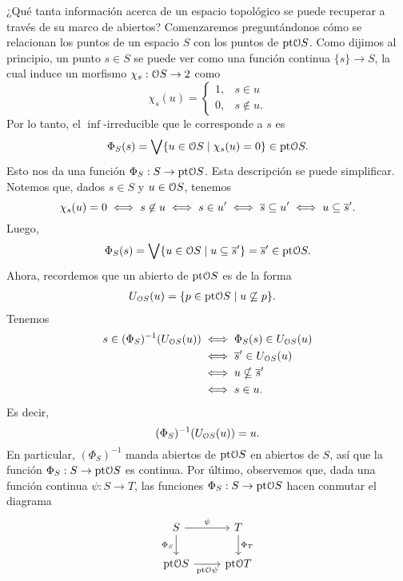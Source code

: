\documentclass{comunicaciones}
\begin{document}
¿Qué tanta información acerca de un espacio topológico se
puede recuperar a través de su marco de abiertos?
Comenzaremos preguntándonos
cómo se relacionan los puntos de un espacio $S$ con los puntos de
$\mathrm{pt}\mathcal{O}S$.
Como dijimos al principio, un punto $s\in S$ se puede ver como una
función continua $\{s\}\to S$, la cual induce un morfismo
$\chi_s:\mathcal{O} S \to 2$ como
\begin{equation}
  \chi_s(u) =
  \begin{cases}
    1, & s\in u  \\
    0, & s\not\in u.
  \end{cases}
\end{equation}
Por lo tanto, el $\inf$-irreducible que le corresponde a $s$ es
\begin{equation}
  \Phi_S(s) = \bigvee\{u\in\mathcal{O}S\mid \chi_s(u)=0\} \in \mathrm{pt}\mathcal{O} S
  .\end{equation}
Esto nos da una función $\Phi_S:S\to\mathrm{pt}\mathcal{O}S$. Esta descripción
se puede simplificar. Notemos que, dados $s\in S$ y $u\in\mathcal{O}S$, tenemos
\[
  \chi_s(u) = 0
  \iff
  s\not\in u
  \iff
  s\in u'
  \iff
  \overline{s} \subseteq u'
  \iff
  u \subseteq {\overline{s}}'.
\]
Luego,
\begin{equation}
  \Phi_S(s)
  =
  \bigvee\{u\in\mathcal{O}S\mid u\subseteq {\overline{s}}'\}
  =
  {\overline{s}}'
  \in
  \mathrm{pt}\mathcal{O}S
.\end{equation}
Ahora, recordemos que un abierto de $\mathrm{pt}\mathcal{O}S$ es de la forma
\begin{align*}
  U_{\mathcal{O}S}(u)
  &= \{p\in\mathrm{pt}\mathcal{O}S \mid u\not\subseteq p\}
.\end{align*}
Tenemos
\begin{align*}
    s\in (\Phi_S)^{-1}(U_{\mathcal{O}S}(u))
    &\iff \Phi_S(s) \in U_{\mathcal{O}S}(u) \\
    &\iff {\overline{s}}' \in U_{\mathcal{O}S}(u) \\
    &\iff u \nsubseteq {\overline{s}}' \\
    &\iff s\in u.
\end{align*}
Es decir,
\[
  (\Phi_S)^{-1}(U_{\mathcal{O}S}(u)) = u
.\]
En particular, $(\Phi_S)^{-1}$ manda abiertos de $\mathrm{pt}\mathcal{O}S$ en
abiertos de $S$, así que la función $\Phi_S:S\to\mathrm{pt}\mathcal{O}S$ es continua.
Por último, observemos que, dada una función continua $\psi:S\to T$,
las funciones $\Phi_S:S\to\mathrm{pt}\mathcal{O}S$ hacen conmutar el diagrama
\[
    \begin{tikzcd}
        S \ar[r,"\psi"] \ar[d,"\Phi_S"'] & T \ar[d,"\Phi_T"] \\
        \pt\Cal OS \ar[r,"\pt\Cal O\psi"'] & \pt\Cal OT
    \end{tikzcd}
\]
\end{document}

